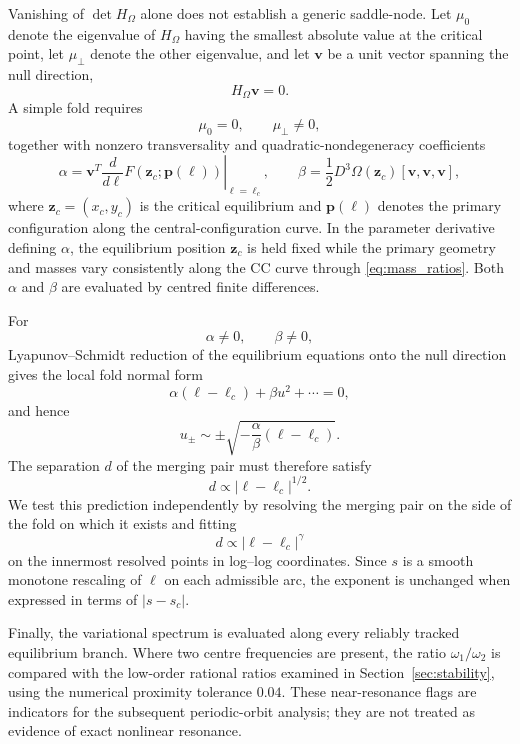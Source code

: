 Vanishing of $\det H_\Omega$ alone does not establish a generic
saddle-node. Let $\mu_0$ denote the eigenvalue of $H_\Omega$ having the
smallest absolute value at the critical point, let $\mu_\perp$ denote the
other eigenvalue, and let $\mathbf v$ be a unit vector spanning the null
direction,
\[
H_\Omega\mathbf v=0.
\]
A simple fold requires
\[
\mu_0=0,
\qquad
\mu_\perp\neq0,
\]
together with nonzero transversality and quadratic-nondegeneracy
coefficients
\begin{equation}
\alpha
=
\mathbf v^{T}
\left.
\frac{d}{d\ell}
F\!\left(\mathbf z_c;\mathbf p(\ell)\right)
\right|_{\ell=\ell_c},
\qquad
\beta
=
\frac{1}{2}
D^3\Omega(\mathbf z_c)
[\mathbf v,\mathbf v,\mathbf v],
\label{eq:fold_coefficients}
\end{equation}
where $\mathbf z_c=(x_c,y_c)$ is the critical equilibrium and
$\mathbf p(\ell)$ denotes the primary configuration along the
central-configuration curve. In the parameter derivative defining
$\alpha$, the equilibrium position $\mathbf z_c$ is held fixed while the
primary geometry and masses vary consistently along the CC curve through
\eqref{eq:mass_ratios}. Both $\alpha$ and $\beta$ are evaluated by centred
finite differences.

For
\[
\alpha\neq0,
\qquad
\beta\neq0,
\]
Lyapunov--Schmidt reduction of the equilibrium equations onto the null
direction gives the local fold normal form
\[
\alpha(\ell-\ell_c)+\beta u^2+\cdots=0,
\]
and hence
\[
u_\pm
\sim
\pm
\sqrt{-\frac{\alpha}{\beta}(\ell-\ell_c)}.
\]
The separation $d$ of the merging pair must therefore satisfy
\begin{equation}
d\propto|\ell-\ell_c|^{1/2}.
\label{eq:fold_scaling}
\end{equation}
We test this prediction independently by resolving the merging pair on the
side of the fold on which it exists and fitting
\[
d\propto|\ell-\ell_c|^\gamma
\]
on the innermost resolved points in log--log coordinates. Since $s$ is a
smooth monotone rescaling of $\ell$ on each admissible arc, the exponent is
unchanged when expressed in terms of $|s-s_c|$.

Finally, the variational spectrum is evaluated along every reliably tracked
equilibrium branch. Where two centre frequencies are present, the ratio
$\omega_1/\omega_2$ is compared with the low-order rational ratios examined
in Section~\ref{sec:stability}, using the numerical proximity tolerance $0.04$. These
near-resonance flags are indicators for the subsequent periodic-orbit
analysis; they are not treated as evidence of exact nonlinear resonance.